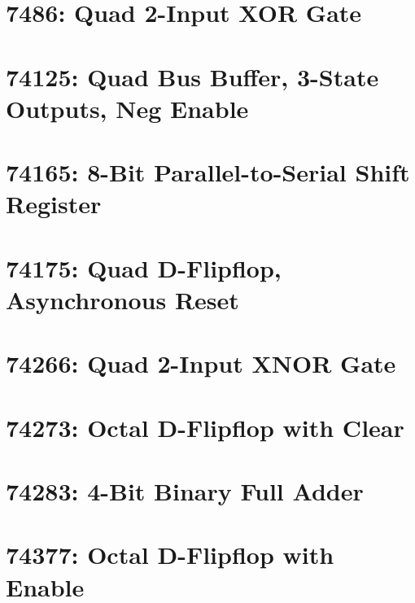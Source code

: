 \section{7486: Quad 2-Input XOR Gate}

\section{74125: Quad Bus Buffer, 3-State Outputs, Neg Enable}

\section{74165: 8-Bit Parallel-to-Serial Shift Register}

\section{74175: Quad D-Flipflop, Asynchronous Reset}

\section{74266: Quad 2-Input XNOR Gate}

\section{74273: Octal D-Flipflop with Clear}

\section{74283: 4-Bit Binary Full Adder}

\section{74377: Octal D-Flipflop with Enable}



